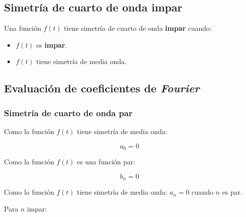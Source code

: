\subsection{Simetría de cuarto de onda impar}
Una función $f(t)$ tiene simetría de cuarto de onda \textbf{impar} cuando:

\begin{itemize}
    \item $f(t)$ es \textbf{impar}.
    \item $f(t)$ tiene simetría de media onda.
\end{itemize}

\begin{figure}[H]
    \centering
    
\end{figure}

\subsection{Evaluación de coeficientes de \emph{Fourier}}

\subsubsection{Simetría de cuarto de onda par}
Como la función $f(t)$ tiene simetría de media onda:

\begin{equation}
    a_0=0
\end{equation}

Como la función $f(t)$ es una función par:

\begin{equation}
    b_n=0
\end{equation}

Como la función $f(t)$ tiene simetría de media onda: $a_n=0$ cuando $n$ es par.

Para $n$ impar:


